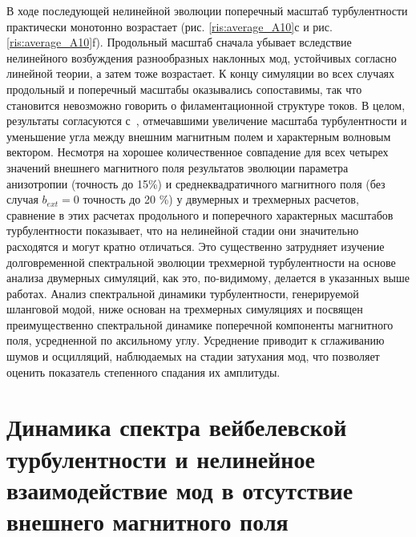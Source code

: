 В ходе последующей нелинейной эволюции поперечный масштаб турбулентности практически монотонно возрастает (рис. \ref{ris:average_A10}с и рис. \ref{ris:average_A10}f). Продольный масштаб сначала убывает вследствие нелинейного возбуждения разнообразных наклонных мод, устойчивых согласно линейной теории, а затем тоже возрастает. К концу симуляции во всех случаях продольный и поперечный масштабы оказывались сопоставимы, так что становится невозможно говорить о филаментационной структуре токов. В целом, результаты согласуются с~\cite{Hellinger2014,Camporeale2008}, отмечавшими увеличение масштаба турбулентности и уменьшение угла между внешним магнитным полем и характерным волновым вектором. Несмотря на хорошее количественное совпадение для всех четырех значений внешнего магнитного поля результатов эволюции параметра анизотропии (точность до 15\%) и среднеквадратичного магнитного поля (без случая $b_{ext}=0$ точность до 20 \%) у двумерных и трехмерных расчетов, сравнение в этих расчетах продольного и поперечного характерных масштабов турбулентности показывает, что на нелинейной стадии они значительно расходятся и могут кратно отличаться.  Это существенно затрудняет изучение долговременной спектральной эволюции трехмерной турбулентности на основе анализа двумерных симуляций, как это, по-видимому, делается в указанных выше работах. Анализ спектральной динамики турбулентности, генерируемой шланговой модой, ниже основан на трехмерных симуляциях и посвящен преимущественно спектральной динамике поперечной компоненты магнитного поля, усредненной по аксильному углу. Усреднение приводит к сглаживанию шумов и осцилляций, наблюдаемых на стадии затухания мод, что позволяет оценить показатель степенного спадания их амплитуды.


\section{Динамика спектра вейбелевской турбулентности и нелинейное взаимодействие мод в отсутствие внешнего магнитного поля}
\label{part_spectr_bo}


